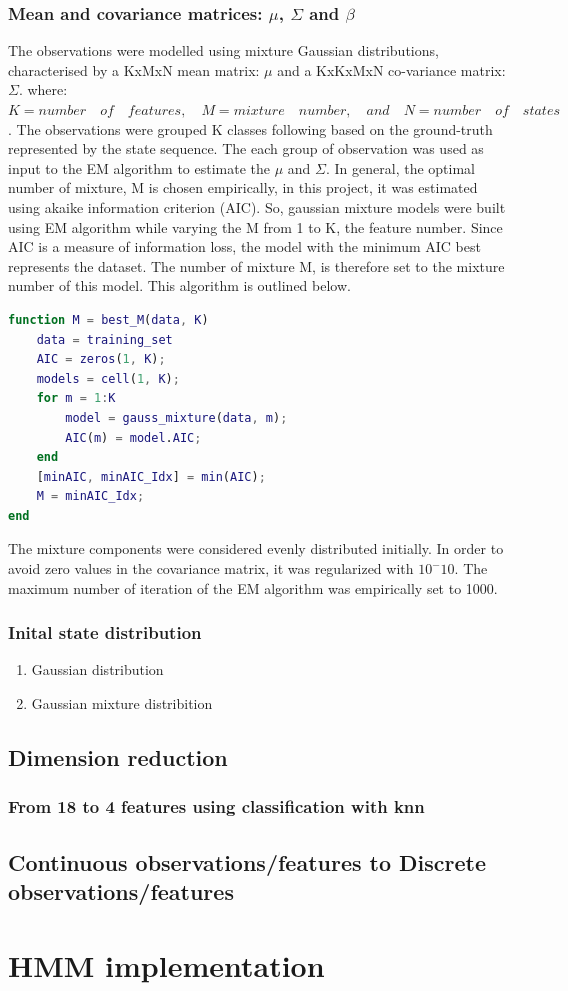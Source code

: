 \subsubsection{Mean and covariance matrices: \(\mu\), \(\Sigma\) and \(\beta\)}
The observations were modelled using mixture Gaussian distributions, characterised by a KxMxN mean matrix: \(\mu\) and a KxKxMxN co-variance matrix: \(\Sigma\).
where: \\ \(K = number \quad of \quad features, \quad M = mixture \quad number, \quad and \quad N = number \quad of \quad states\).
The observations were grouped K classes following based on the ground-truth represented by the state sequence.
The each group of observation was used as input to the EM algorithm to estimate the  \(\mu\) and \(\Sigma\).
In general, the optimal number of mixture, M is chosen empirically, in this project, it was estimated using akaike information criterion (AIC).
So, gaussian mixture models were built using EM algorithm while varying the M from 1 to K, the feature number.
Since AIC is a measure of information loss, the model with the minimum AIC best represents the dataset. The number of mixture M, is therefore set to the mixture number of this model.
This algorithm is outlined below.
\begin{lstlisting}[language=Matlab] 
function M = best_M(data, K)
	data = training_set
	AIC = zeros(1, K);
	models = cell(1, K);
	for m = 1:K
		model = gauss_mixture(data, m);
		AIC(m) = model.AIC;
	end
	[minAIC, minAIC_Idx] = min(AIC);
	M = minAIC_Idx;
end
\end{lstlisting} 

The mixture components were considered evenly distributed initially.
In order to avoid zero values in the covariance matrix, it was regularized with \(10^-10\).
The maximum number of iteration of the EM algorithm was empirically set to 1000.

\subsubsection{Inital state distribution}
\begin{enumerate}
	\item Gaussian distribution
	\item Gaussian mixture distribition
	\end{enumerate}
\subsection{Dimension reduction}
\subsubsection{From 18 to 4 features using classification with knn}
\subsection{Continuous observations/features to Discrete observations/features}

\section{HMM implementation}